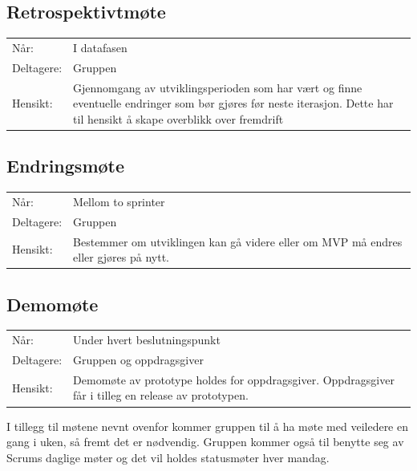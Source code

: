 \subsection*{Retrospektivtmøte}
\bigskip{}
\begin{tabular}{l p{11cm}}
    Når: & I datafasen \\
    Deltagere: & Gruppen \\
    Hensikt: & Gjennomgang av utviklingsperioden som har vært og finne eventuelle endringer som bør gjøres før neste iterasjon. Dette har til hensikt å skape overblikk over fremdrift
\end{tabular}

\subsection*{Endringsmøte}
\bigskip{}
\begin{tabular}{l p{11cm}}
    Når: & Mellom to sprinter \\
    Deltagere: & Gruppen \\
    Hensikt: & Bestemmer om utviklingen kan gå videre eller om MVP må endres eller gjøres på nytt.
\end{tabular}

\subsection*{Demomøte}
\bigskip{}
\begin{tabular}{l p{11cm}}
    Når: & Under hvert beslutningspunkt \\
    Deltagere: & Gruppen og oppdragsgiver \\
    Hensikt: & Demomøte av prototype holdes for oppdragsgiver. Oppdragsgiver får i tilleg en release av prototypen.
\end{tabular}
\bigskip{}
I tillegg til møtene nevnt ovenfor kommer gruppen til å ha møte med veiledere en gang i uken, så fremt det er nødvendig. Gruppen kommer også til benytte seg av Scrums daglige møter og det vil holdes statusmøter hver mandag.

